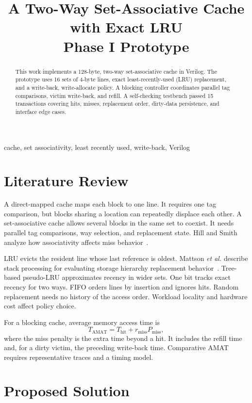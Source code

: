 \documentclass[conference]{IEEEtran}
\title{A Two-Way Set-Associative Cache with Exact LRU\\Phase I Prototype}
\author{\IEEEauthorblockN{Aaditya Yadav, Gauri Mishra, Bhumi Rastogi, Ansh Sharma, and Anugra}}
\begin{document}
\maketitle
\begin{abstract}
This work implements a 128-byte, two-way set-associative cache in Verilog.
The prototype uses 16 sets of 4-byte lines, exact least-recently-used (LRU)
replacement, and a write-back, write-allocate policy. A blocking controller
coordinates parallel tag comparisons, victim write-back, and refill. A
self-checking testbench passed 15 transactions covering hits, misses,
replacement order, dirty-data persistence, and interface edge cases.
\end{abstract}
\begin{IEEEkeywords}
cache, set associativity, least recently used, write-back, Verilog
\end{IEEEkeywords}

\section{Literature Review}
A direct-mapped cache maps each block to one line. It requires one tag
comparison, but blocks sharing a location can repeatedly displace each
other. A set-associative cache allows several blocks in the same set to
coexist. It needs parallel tag comparisons, way selection, and replacement
state. Hill and Smith analyze how associativity affects miss behavior~\cite{hill}.

LRU evicts the resident line whose last reference is oldest.
Mattson \emph{et al.} describe stack processing for evaluating storage
hierarchy replacement behavior~\cite{mattson}. Tree-based pseudo-LRU
approximates recency in wider sets. One bit tracks exact recency for two
ways. FIFO orders lines by insertion and ignores hits. Random replacement
needs no history of the access order. Workload locality and hardware cost
affect policy choice.

For a blocking cache, average memory access time is
\begin{equation}
T_{\mathrm{AMAT}} = T_{\mathrm{hit}} + r_{\mathrm{miss}} P_{\mathrm{miss}},
\end{equation}
where the miss penalty is the extra time beyond a hit. It includes the
refill time and, for a dirty victim, the preceding write-back time.
Comparative AMAT requires representative traces and a timing model.

\section{Proposed Solution}
\end{document}
